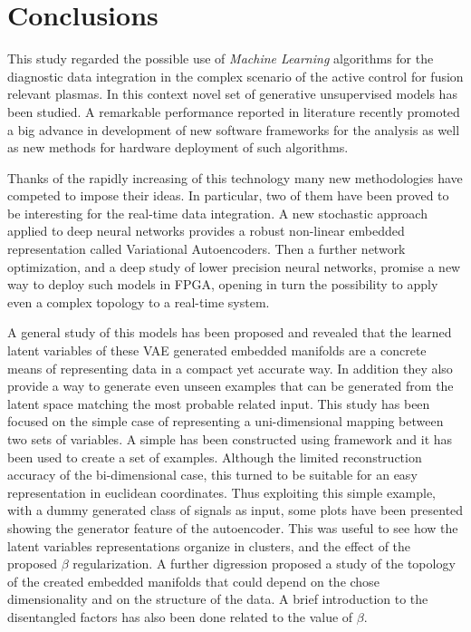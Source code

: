 \chapter{Conclusions}
\label{section:8_conclusions}


This study regarded the possible use of \textit{Machine Learning} algorithms for the diagnostic data integration in the complex scenario of the active control for fusion relevant plasmas.
In this context novel set of generative unsupervised models has been studied.
A remarkable performance reported in literature recently promoted a big advance in development of new software frameworks for the analysis as well as new methods for hardware deployment of such algorithms.

Thanks of the rapidly increasing of this technology many new methodologies have competed to impose their ideas.
In particular, two of them have been proved to be interesting for the real-time data integration.
A new stochastic approach applied to deep neural networks provides a robust non-linear embedded representation called Variational Autoencoders.
Then a further network optimization, and a deep study of lower precision neural networks, promise a new way to deploy such models in FPGA, opening in turn the possibility to apply even a complex topology to a real-time system.

A general study of this models has been proposed and revealed that the learned latent variables of these VAE generated embedded manifolds are a concrete means of representing data in a compact yet accurate way. In addition they also provide a way to generate even unseen examples that can be generated from the latent space matching the most probable related input.
This study has been focused on the simple case of representing a uni-dimensional mapping between two sets of variables.
A simple  has been constructed using \Tensorflow framework and it has been used to create a set of examples. Although the limited reconstruction accuracy of the bi-dimensional case, this turned to be suitable for an easy representation in euclidean coordinates. 
Thus exploiting this simple example, with a dummy generated class of signals as input, some plots have been presented showing the generator feature of the autoencoder. This was useful to see how the latent variables representations organize in clusters, and the effect of the proposed $\beta$ regularization.
A further digression proposed a study of the topology of the created embedded manifolds that could depend on the chose dimensionality and on the structure of the data. A brief introduction to the disentangled factors has also been done related to the value of $\beta$.

